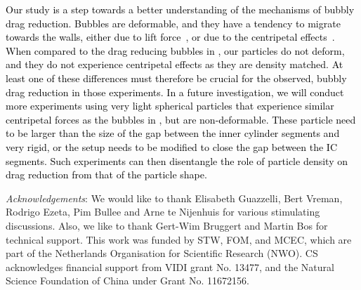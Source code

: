 \documentclass{jfm}
\newcommand{\red}[1]{\textcolor{black}{#1}}
\begin{document}
\textcolor{black}{Our study is a step towards a better understanding of the
mechanisms of bubbly drag reduction. Bubbles are deformable, and they have
a tendency to migrate towards the walls, either due to lift
force~\citep{Dabiri2013}, or due to the centripetal
effects~\citep{vanGils2013}. When compared to the drag reducing bubbles in
\cite{vanGils2013,Verschoof2016}, our particles do not deform, and they do
not \red{experience centripetal effects as they are density matched}.  At
least one of these differences must therefore be crucial for the observed,
bubbly drag reduction in those experiments.
\red{
In a future investigation, we will conduct more experiments using very light
spherical particles that experience similar centripetal forces as the bubbles
in \cite{vanGils2013}, but are non-deformable.} These particle need to be
larger than the size of the gap between the inner cylinder segments and very
rigid, or the setup needs to be modified to close the gap between the IC
segments.  Such experiments can then disentangle the role of particle density
on drag reduction from that of the particle shape.
}

\emph{Acknowledgements}: We would like to thank Elisabeth Guazzelli, Bert
Vreman, Rodrigo Ezeta, Pim Bullee and Arne te Nijenhuis for various
stimulating discussions. Also, we like to thank Gert-Wim Bruggert and Martin
Bos for technical support. This work was funded by STW, FOM, and MCEC, which
are part of the Netherlands Organisation for Scientific Research (NWO). CS
acknowledges financial support from VIDI grant No. 13477, and the Natural
Science Foundation of China under Grant No. 11672156.




\end{document}
